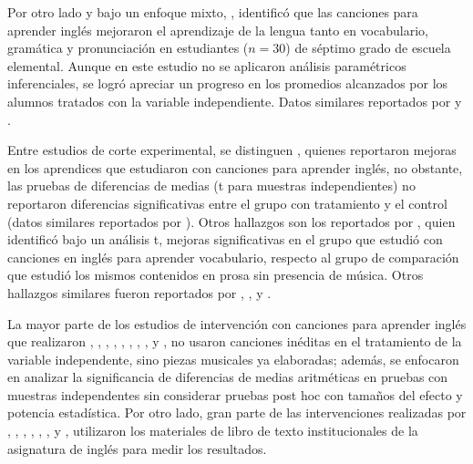 \documentclass[spanish]{textolivre}
\begin{document}
Por otro lado y bajo un enfoque mixto, \textcite{ratnasari2007}, identificó que las canciones para aprender inglés mejoraron el aprendizaje de la lengua tanto en vocabulario, gramática y pronunciación en estudiantes ($n=30$) de séptimo grado de escuela elemental. Aunque en este estudio no se aplicaron análisis paramétricos inferenciales, se logró apreciar un progreso en los promedios alcanzados por los alumnos tratados con la variable independiente. Datos similares reportados por \textcite{shen2009using} y \textcite{farmand12013effect}.

Entre estudios de corte experimental, se distinguen \textcite{suwartono2019songs}, quienes reportaron mejoras en los aprendices que estudiaron con canciones para aprender inglés, no obstante, las pruebas de diferencias de medias (t para muestras independientes) no reportaron diferencias significativas entre el grupo con tratamiento y el control (datos similares reportados por \textcite{jabak2021role}). Otros hallazgos son los reportados por \textcite{javadisafa2018effects}, quien identificó bajo un análisis t, mejoras significativas en el grupo que estudió con canciones en inglés para aprender vocabulario, respecto al grupo de comparación que estudió los mismos contenidos en prosa sin presencia de música. Otros hallazgos similares fueron reportados por \textcite{komur2005teaching}, \textcite{malekian2016relationship}, \textcite{andradesanchez2017use} y \textcite{luo2019influence}.

La mayor parte de los estudios de intervención con canciones para aprender inglés que realizaron \textcite{komur2005teaching}, \textcite{forster2006value}, \textcite{ghanbari2014effects}, \textcite{moradi2014effect}, \textcite{malekian2016relationship}, \textcite{javadisafa2018effects}, \textcite{wahyuningsih2019kreasi}, \textcite{suwartono2019songs}, \textcite{jabak2021role} y \textcite{saldiraner2021using}, no usaron canciones inéditas en el tratamiento de la variable independente, sino piezas musicales ya elaboradas; además, se enfocaron en analizar la significancia de diferencias de medias aritméticas en pruebas con muestras independentes sin considerar pruebas post hoc con tamaños del efecto y potencia estadística. Por otro lado, gran parte de las intervenciones realizadas por \textcite{farmand12013effect}, \textcite{ghanbari2014effects}, \textcite{shehadejiman2016effectiveness}, \textcite{malekian2016relationship}, \textcite{manikandan2011frequency}, \textcite{javadisafa2018effects}, \textcite{suwartono2019songs} y \textcite{saldiraner2021using}, utilizaron los materiales de libro de texto institucionales de la asignatura de inglés para medir los resultados.
\end{document}
